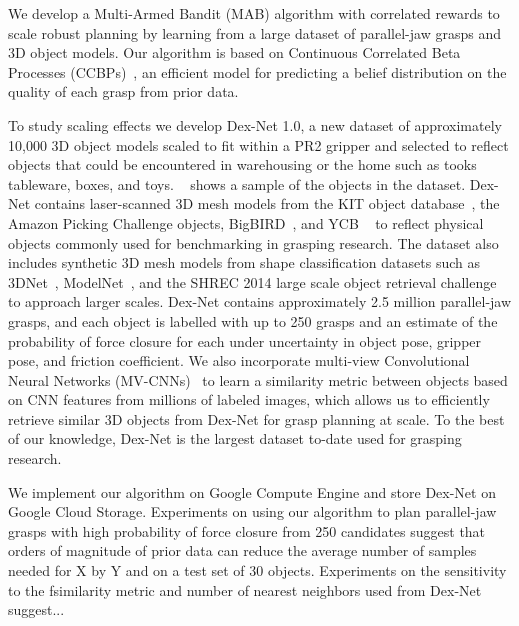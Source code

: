 We develop a Multi-Armed Bandit (MAB) algorithm with correlated rewards to scale robust planning by learning from a large dataset of parallel-jaw grasps and 3D object models.
Our algorithm is based on Continuous Correlated Beta Processes (CCBPs)~\cite{goetschalckx2011continuous, montesano2012active}, an efficient model for predicting a belief distribution on the quality of each grasp from prior data.

To study scaling effects we develop Dex-Net 1.0, a new dataset of approximately 10,000 3D object models scaled to fit within a PR2 gripper and selected to reflect objects that could be encountered in warehousing or the home such as tooks tableware, boxes, and toys.
~ shows a sample of the objects in the dataset.
Dex-Net contains laser-scanned 3D mesh models from the KIT object database~\cite{kasper2012kit}, the Amazon Picking Challenge objects, BigBIRD~\cite{singh2014bigbird}, and YCB ~\cite{calli2015benchmarking} to reflect physical objects commonly used for benchmarking in grasping research.
The dataset also includes synthetic 3D mesh models from shape classification datasets such as 3DNet~\cite{wohlkinger20123dnet}, ModelNet~\cite{wu20143d}, and the SHREC 2014 large scale object retrieval challenge~\cite{li2015comparison} to approach larger scales.
Dex-Net contains approximately 2.5 million parallel-jaw grasps, and each object is labelled with up to 250 grasps and an estimate of the probability of force closure for each under uncertainty in object pose, gripper pose, and friction coefficient.
We also incorporate multi-view Convolutional Neural Networks (MV-CNNs)~\cite{su2015multi} to learn a similarity metric between objects based on CNN features  from millions of labeled images, which allows us to efficiently retrieve similar 3D objects from Dex-Net for grasp planning at scale. 
To the best of our knowledge, Dex-Net is the largest dataset to-date used for grasping research.

We implement our algorithm on Google Compute Engine and store Dex-Net on Google Cloud Storage.
Experiments on using our algorithm to plan parallel-jaw grasps with high probability of force closure from 250 candidates suggest that orders of magnitude of prior data can reduce the average number of samples needed for X by Y and  on a test set of 30 objects.
Experiments on the sensitivity to the fsimilarity metric and number of nearest neighbors used from Dex-Net suggest...

 





